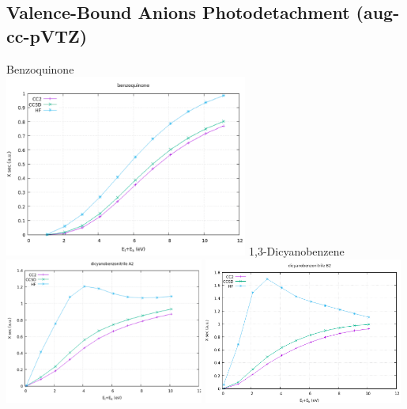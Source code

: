 \subsection*{Valence-Bound Anions Photodetachment (aug-cc-pVTZ)}
Benzoquinone\\
\includegraphics[width=0.6\textwidth]{chapters/appendix/image/benzoquinone.png}
\vfill
1,3-Dicyanobenzene\\
\includegraphics[width=0.49\textwidth]{chapters/appendix/image/diacyanobenzene1.png}
\includegraphics[width=0.49\textwidth]{chapters/appendix/image/diacyanobenzene2.png}\\
\vfill
\clearpage

